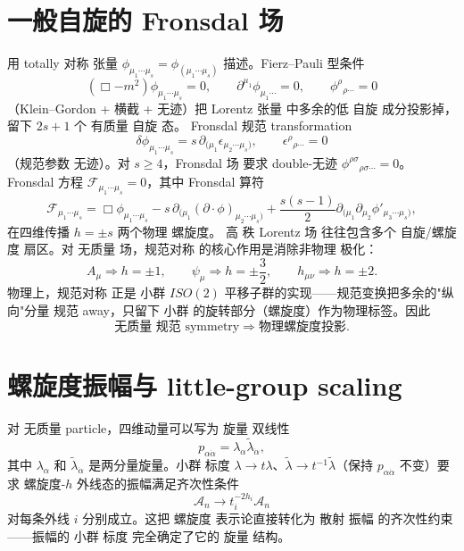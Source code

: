 

\section{一般自旋的 Fronsdal 场}
用 totally 对称 张量 $\phi_{\mu_1\cdots\mu_s}=\phi_{(\mu_1\cdots\mu_s)}$ 描述。Fierz--Pauli 型条件
\begin{equation}
(\Box-m^2)\phi_{\mu_1\cdots\mu_s}=0,\qquad \partial^{\mu_1}\phi_{\mu_1\cdots}=0,\qquad \phi^\rho{}_{\rho\cdots}=0
\end{equation}
（Klein--Gordon + 横截 + 无迹）把 Lorentz 张量 中多余的低 自旋 成分投影掉，留下 $2s+1$ 个 有质量 自旋 态。
Fronsdal 规范 transformation
\begin{equation}
\delta\phi_{\mu_1\cdots\mu_s}=s\,\partial_{(\mu_1}\epsilon_{\mu_2\cdots\mu_s)},\qquad \epsilon^\rho{}_{\rho\cdots}=0
\end{equation}
（规范参数 无迹）。对 $s\ge4$，Fronsdal 场 要求 double-无迹 $\phi^{\rho\sigma}{}_{\rho\sigma\cdots}=0$。Fronsdal 方程 $\mathcal{F}_{\mu_1\cdots\mu_s}=0$，其中 Fronsdal 算符
\begin{equation}
\mathcal{F}_{\mu_1\cdots\mu_s}=\Box\phi_{\mu_1\cdots\mu_s}-s\,\partial_{(\mu_1}(\partial\cdot\phi)_{\mu_2\cdots\mu_s)}+\frac{s(s-1)}{2}\partial_{(\mu_1}\partial_{\mu_2}\phi'_{\mu_3\cdots\mu_s)},
\end{equation}
在四维传播 $h=\pm s$ 两个物理 螺旋度。
高 秩 Lorentz 场 往往包含多个 自旋/螺旋度 扇区。对 无质量 场，规范对称 的核心作用是消除非物理 极化：
\begin{equation}
A_\mu\Rightarrow h=\pm 1,\qquad \psi_\mu\Rightarrow h=\pm\frac{3}{2},\qquad h_{\mu\nu}\Rightarrow h=\pm 2.
\end{equation}
物理上，规范对称 正是 小群 $ISO(2)$ 平移子群的实现——规范变换把多余的"纵向"分量 规范 away，只留下 小群 的旋转部分（螺旋度）作为物理标签。因此
\begin{equation}
\text{无质量 规范 symmetry}\Longrightarrow\text{物理螺旋度投影}.
\end{equation}



\section{螺旋度振幅与 little-group scaling}

对 无质量 particle，四维动量可以写为 旋量 双线性
\begin{equation}
p_{\alpha\dot\alpha}=\lambda_\alpha\tilde\lambda_{\dot\alpha},
\end{equation}
其中 $\lambda_\alpha$ 和 $\tilde\lambda_{\dot\alpha}$ 是两分量旋量。小群 标度 $\lambda\to t\lambda$、$\tilde\lambda\to t^{-1}\tilde\lambda$（保持 $p_{\alpha\dot\alpha}$ 不变）要求 螺旋度-$h$ 外线态的振幅满足齐次性条件
\begin{equation*}{\mathcal{A}_n\to t_i^{-2h_i}\mathcal{A}_n}
\end{equation*}
对每条外线 $i$ 分别成立。这把 螺旋度 表示论直接转化为 散射 振幅 的齐次性约束——振幅的 小群 标度 完全确定了它的 旋量 结构。

